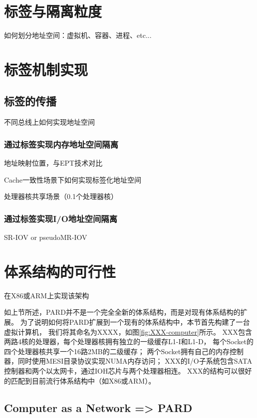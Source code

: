 \section{标签与隔离粒度}

如何划分地址空间：虚拟机、容器、进程、etc...

\section{标签机制实现}

\subsection{标签的传播}

不同总线上如何实现地址空间

\subsubsection{通过标签实现内存地址空间隔离}

地址映射位置，与EPT技术对比

Cache一致性场景下如何实现标签化地址空间

处理器核共享场景（0.1个处理器核）

\subsubsection{通过标签实现I/O地址空间隔离}

SR-IOV or pseudoMR-IOV

\section{体系结构的可行性}

在X86或ARM上实现该架构


如上节所述，PARD并不是一个完全全新的体系结构，而是对现有体系结构的扩展。
为了说明如何将PARD扩展到一个现有的体系结构中，本节首先构建了一台虚拟计算机，
我们将其命名为XXXX，如图\ref{fig:XXX-computer}所示。
XXX包含两路4核的处理器，每个处理器核拥有独立的一级缓存L1-I和L1-D，
每个Socket的四个处理器核共享一个16路2MB的二级缓存；
两个Socket拥有自己的内存控制器，同时使用MESI目录协议实现NUMA内存访问；
XXX的I/O子系统包含SATA控制器和两个以太网卡，通过IOH芯片与两个处理器相连。
XXX的结构可以很好的匹配到目前流行体系结构中（如X86或ARM）。

\subsection{Computer as a Network => PARD}

